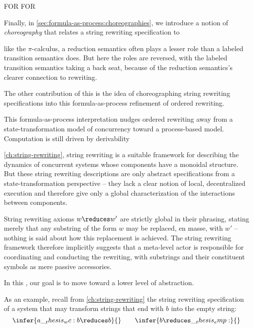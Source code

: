 \ac{FOR}
\Ac{FOR}

Finally, in \cref{sec:formula-as-process:choreographies}, we introduce a notion of \emph{choreography} that relates a string rewriting specification to 


 like the $\pi$-calculus, a reduction semantics often plays a lesser role than a labeled transition semantics does.
But here the roles are reversed, with the labeled transition semantics taking a back seat, because of the reduction semantics's clearer connection to rewriting.

The other contribution of this  is the idea of choreographing string rewriting specifications into this formula-as-process refinement of ordered rewriting.

This formula-as-process interpretation nudges ordered rewriting away from a state-transformation model of concurrency toward a process-based model.
Computation is still driven by derivability



 \cref{ch:string-rewriting}, string rewriting is a suitable framework for describing the dynamics of concurrent systems whose components have a monoidal structure.
But these string rewriting descriptions are only abstract specifications from a state-transformation perspective -- they lack a clear notion of local, decentralized execution and therefore give only a global characterization of the interactions between components.

String rewriting axioms $w \reduces w'$ are strictly global in their phrasing, stating merely that any substring of the form $w$ may be replaced, en masse, with $w'$ -- nothing is said about how this replacement is achieved.
The string rewriting framework therefore implicitly suggests that a meta-level actor is responsible for coordinating and conducting the rewriting, with substrings and their constituent symbols as mere passive accessories.

In this , our goal is to move toward a lower level of abstraction.


As an example, recall from \cref{ch:string-rewriting} the string rewriting specification of a system that may transform strings that end with $b$ into the empty string:
\begin{equation}
  \infer{a \wc b \reduces b}{}
  \qquad
  \infer{b \reduces \emp}{}
\end{equation}


